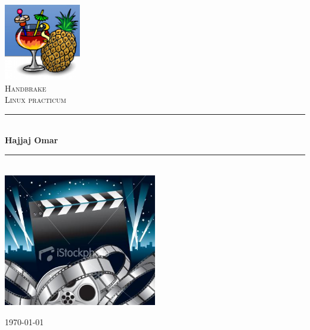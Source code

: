 \documentclass[12pt,a4paper]{report}
\newcommand{\HRule}{\rule{\linewidth}{0.5mm}}
\begin{document}
\begin{titlepage}

\begin{center}


\includegraphics[width=0.25\textwidth]{./handbrake.png}\\[1cm]    

\textsc{\LARGE Handbrake}\\[1.5cm]

\textsc{\Large Linux practicum}\\[0.5cm]


\HRule \\[0.4cm]
{ \huge \bfseries Hajjaj Omar}\\[0.3cm]

\HRule \\[1.5cm]
\includegraphics[width=0.5\textwidth]{./movie.png}\\[1cm]

\vfill

{\large \today}

\end{center}

\end{titlepage}
\end{document}
